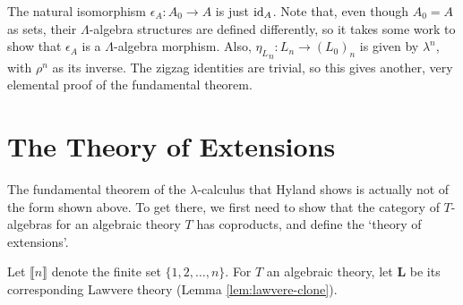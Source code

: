 \begin{remark}
  The natural isomorphism $ \epsilon_A: A_0 \to A $ is just $ \text{id}_{A} $. Note that, even though $ A_0 = A $ as sets, their $ \Lambda $-algebra structures are defined differently, so it takes some work to show that $ \epsilon_A $ is a $ \Lambda $-algebra morphism. Also, $ {\eta_L}_n : L_n \to (L_0)_n $ is given by $ \lambda^n $, with $ \rho^n $ as its inverse. The zigzag identities are trivial, so this gives another, very elemental proof of the fundamental theorem.
\end{remark}

\section{The Theory of Extensions}\label{sec:theory-of-extentions}

The fundamental theorem of the $ \lambda $-calculus that Hyland shows is actually not of the form shown above. To get there, we first need to show that the category of $ T $-algebras for an algebraic theory $ T $ has coproducts, and define the `theory of extensions'.

Let $ \llbracket n \rrbracket $ denote the finite set $ \{ 1, 2, \dots, n \} $. For $ T $ an algebraic theory, let $ \mathbf L $ be its corresponding Lawvere theory (Lemma \ref{lem:lawvere-clone}).

